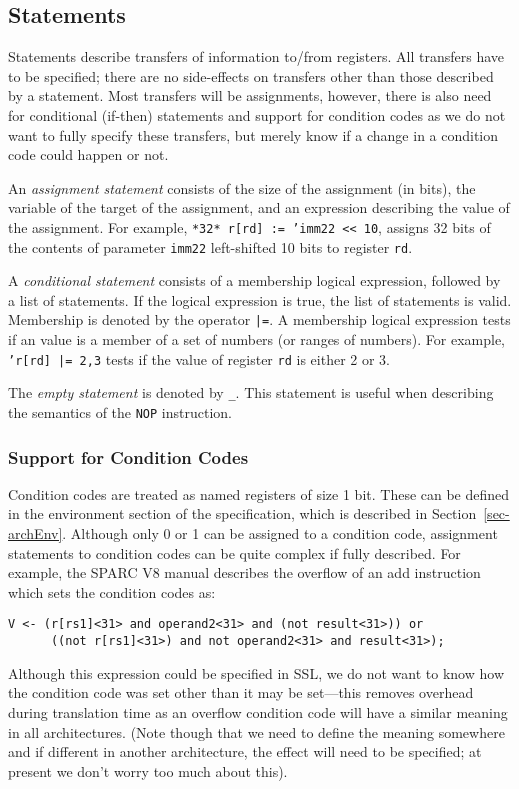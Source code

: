 

\subsection{Statements}
\label{sec-stmts}
Statements describe transfers of information to/from registers.
All transfers have to be specified; there are no side-effects 
on transfers other than those described by a statement.
Most transfers will be assignments, however, there is also need
for conditional (if-then) statements and support for condition
codes as we do not want to fully specify these transfers, but
merely know if a change in a condition code could happen or not.

An \emph{assignment statement} consists of the size of the assignment
(in bits), the variable of the target of the assignment, and 
an expression describing the value of the assignment.
For example, \texttt{*32* r[rd] := 'imm22 << 10}, assigns 32 bits of 
the contents of parameter \texttt{imm22} left-shifted 10 bits to 
register \texttt{rd}.

A \emph{conditional statement} consists of a membership logical expression,
followed by a list of statements.  If the logical expression is
true, the list of statements is valid.  
Membership is denoted by the operator \texttt{|=}.  
A membership logical expression tests if an value is a member of
a set of numbers (or ranges of numbers).  
For example, \texttt{'r[rd] |= {2,3}} tests if the value of register
\texttt{rd} is either 2 or 3.

The \emph{empty statement} is denoted by \texttt{\_}.  This statement
is useful when describing the semantics of the \texttt{NOP} 
instruction.


\subsubsection*{Support for Condition Codes}
Condition codes are treated as named registers of size 1 bit. 
These can be defined in the environment section of the specification,
which is described in Section~\ref{sec-archEnv}.
Although only 0 or 1 can be assigned to a condition code, assignment 
statements to condition codes can be quite complex if fully described.
For example, the SPARC V8 manual describes the overflow of an 
add instruction which sets the condition codes as:
\begin{verbatim}
V <- (r[rs1]<31> and operand2<31> and (not result<31>)) or
      ((not r[rs1]<31>) and not operand2<31> and result<31>);
\end{verbatim}
Although this expression could be specified in SSL, we do not 
want to know how the condition code was set other than it may
be set---this removes overhead during translation time as an 
overflow condition code will have a similar meaning in all 
architectures.  (Note though that we need to define the meaning
somewhere and if different in another architecture, the effect
will need to be specified; at present we don't worry too much
about this).  


